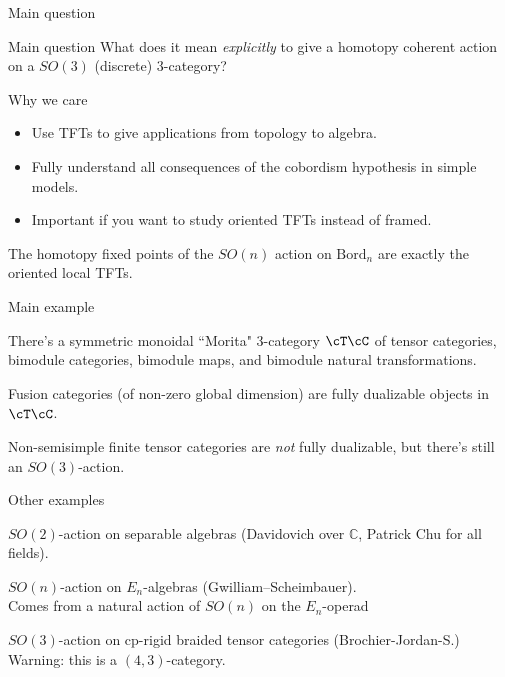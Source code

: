 \documentclass[beamer]{beamer}
\begin{document}
\begin{frame}{Main question}

\begin{block}{Main question}
What does it mean \emph{explicitly} to give a homotopy coherent action on a $SO(3)$ (discrete) $3$-category?
\end{block}

\begin{block}{Why we care}
\begin{itemize}
\item Use TFTs to give applications from topology to algebra.
\item Fully understand all consequences of the cobordism hypothesis in simple models.
\item Important if you want to study oriented TFTs instead of framed.
\end{itemize}
\end{block}

\begin{theorem}[Lurie]
The homotopy fixed points of the $SO(n)$ action on $\mathrm{Bord}_n$ are exactly the oriented local TFTs.
\end{theorem}

\end{frame}



\begin{frame}{Main example}

\begin{theorem}
There's a symmetric monoidal ``Morita" $3$-category $\cT\cC$ of tensor categories, bimodule categories, bimodule maps, and bimodule natural transformations.
\end{theorem}

\begin{theorem}[DSPS 13]
Fusion categories (of non-zero global dimension) are fully dualizable objects in $\cT\cC$.
\end{theorem}

\begin{conj}[DSPS 13]
Non-semisimple finite tensor categories are \emph{not} fully dualizable, but there's still an $SO(3)$-action.
\end{conj}
\end{frame}

\begin{frame}{Other examples}
\begin{example}
$SO(2)$-action on separable algebras (Davidovich over $\mathbb{C}$, Patrick Chu for all fields).
\end{example}

\begin{example}
$SO(n)$-action on $E_n$-algebras (Gwilliam--Scheimbauer).  \\ Comes from a natural action of $SO(n)$ on the $E_n$-operad
\end{example}

\begin{example}
$SO(3)$-action on cp-rigid braided tensor categories (Brochier-Jordan-S.)  Warning: this is a $(4,3)$-category.
\end{example}
\end{frame}
\end{document}
